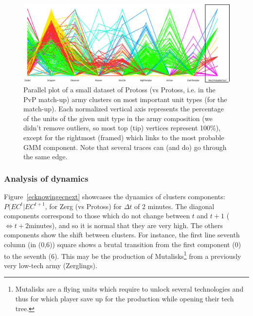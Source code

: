 \begin{figure}[h]
\centerline{\includegraphics[width=1.16\columnwidth]{images/PvP_small.png}}
\caption{Parallel plot of a small dataset of Protoss (vs Protoss, i.e. in the PvP match-up) army clusters on most important unit types (for the match-up). Each normalized vertical axis represents the percentage of the units of the given unit type in the army composition (we didn't remove outliers, so most top (tip) vertices represent 100\%), except for the rightmost (framed) which links to the most probable GMM component. Note that several traces can (and do) go through the same edge.}
\label{fig:parallelplot}
\end{figure}

\subsubsection{Analysis of dynamics}

Figure~\ref{ecknowingecnext} showcases the dynamics of clusters components: $P(EC^t|EC^{t+1}$, for Zerg (vs Protoss) for $\Delta t$ of 2 minutes. The diagonal components correspond to those which do not change between $t$ and $t+1$ ($\Leftrightarrow t+2$minutes), and so it is normal that they are very high. The others components show the shift between clusters. For instance, the first line seventh column (in (0,6)) square shows a brutal transition from the first component (0) to the seventh (6). This may be the production of Mutalisks\footnote{Mutalisks are a flying units which require to unlock several technologies and thus for which player save up for the production while opening their tech tree.} from a previously very low-tech army (Zerglings).

